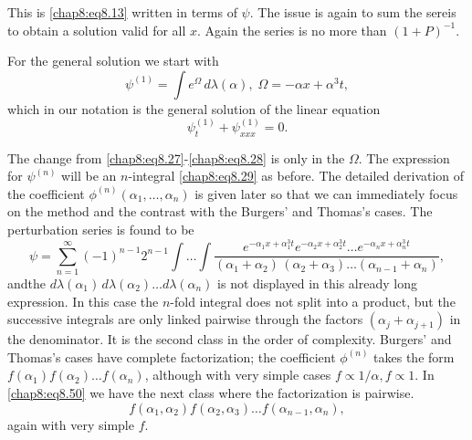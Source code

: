 This is \eqref{chap8:eq8.13} written in terms of $\psi$. The issue is again to sum the sereis to obtain a solution valid for all $x$. Again the series is no more than $(1+P)^{-1}$. 

For the general solution we start with
\begin{equation}
\psi^{(1)}=\int e^\Omega\,d\lambda(\alpha),\;\Omega=-\alpha x+\alpha^3 t, \tag{8.48}\label{chap8:eq8.48}
\end{equation}
which in our notation is the general solution of the linear equation 
\begin{equation}
\psi_t^{(1)}+\psi_{xxx}^{(1)}=0.\tag{8.49}\label{chap8:eq8.49}
\end{equation}

The change from \eqref{chap8:eq8.27}-\eqref{chap8:eq8.28} is only in the $\Omega$. The expression for $\psi^{(n)}$ will be an $n$-integral \eqref{chap8:eq8.29} as before. The detailed derivation of the coefficient $\phi^{(n)}(\alpha_1,\ldots,\alpha_n)$ is given later so that we can immediately focus on the method and the contrast with the Burgers' and Thomas's cases. The perturbation series is found to be 
\begin{equation}
\psi=\sum\limits_{n=1}^\infty(-1)^{n-1}2^{n-1}\int\ldots\int \frac{e^{-\alpha_1 x+\alpha_1^3 t} e^{-\alpha_2 x+\alpha_2^3 t}\ldots e^{-\alpha_n x+\alpha_n^3 t}} {\left(\alpha_1+\alpha_2\right)\,\left(\alpha_2+\alpha_3\right)\ldots\left( \alpha_{n-1}+\alpha_n\right)},\tag{8.50}\label{chap8:eq8.50}
\end{equation}
and\pageoriginale the $d\lambda(\alpha_1)\,d\lambda(\alpha_2)\ldots d\lambda (\alpha_n)$ is not displayed in this already long expression. In this case the $n$-fold integral does not split into a product, but the successive integrals are only linked pairwise through the factors $(\alpha_j+\alpha_{j+1})$ in the denominator. It is the second class in the order of complexity. Burgers' and Thomas's cases have complete factorization; the coefficient $\phi^{(n)}$ takes the form $f(\alpha_1)f(\alpha_2)\ldots f(\alpha_n)$, although with very simple cases $f\propto 1/\alpha, f\propto 1$. In \eqref{chap8:eq8.50} we have the next class where the factorization is pairwise.
\begin{equation}
f\left(\alpha_1,\alpha_2\right)f\left(\alpha_2,\alpha_3\right)\ldots f\left(\alpha_{n-1},\alpha_n\right),\tag{8.51}\label{chap8:eq8.51}
\end{equation}
again with very simple $f$.

